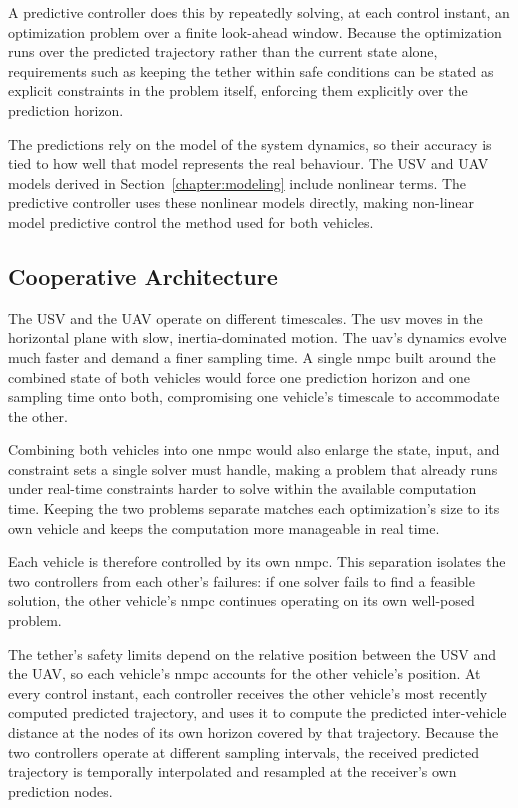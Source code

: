 A predictive controller does this by repeatedly solving, at each control instant, an optimization problem over a finite look-ahead window. Because the optimization runs over the predicted trajectory rather than the current state alone, requirements such as keeping the tether within safe conditions can be stated as explicit constraints in the problem itself, enforcing them explicitly over the prediction horizon.

The predictions rely on the model of the system dynamics, so their accuracy is tied to how well that model represents the real behaviour. The USV and UAV models derived in Section~\ref{chapter:modeling} include nonlinear terms. The predictive controller uses these nonlinear models directly, making non-linear model predictive control the method used for both vehicles.


\subsection{Cooperative Architecture}
\label{sec:ctrl_coop_architecture}

The USV and the UAV operate on different timescales. The \gls{usv} moves in the horizontal plane with slow, inertia-dominated motion. The \gls{uav}'s dynamics evolve much faster and demand a finer sampling time. A single \gls{nmpc} built around the combined state of both vehicles would force one prediction horizon and one sampling time onto both, compromising one vehicle's timescale to accommodate the other.

Combining both vehicles into one \gls{nmpc} would also enlarge the state, input, and constraint sets a single solver must handle, making a problem that already runs under real-time constraints harder to solve within the available computation time. Keeping the two problems separate matches each optimization's size to its own vehicle and keeps the computation more manageable in real time.

Each vehicle is therefore controlled by its own \gls{nmpc}. This separation isolates the two controllers from each other's failures: if one solver fails to find a feasible solution, the other vehicle's \gls{nmpc} continues operating on its own well-posed problem.

The tether's safety limits depend on the relative position between the USV and the UAV, so each vehicle's \gls{nmpc} accounts for the other vehicle's position. At every control instant, each controller receives the other vehicle's most recently computed predicted trajectory, and uses it to compute the predicted inter-vehicle distance at the nodes of its own horizon covered by that trajectory. Because the two controllers operate at different sampling intervals, the received predicted trajectory is temporally interpolated and resampled at the receiver's own prediction nodes.

